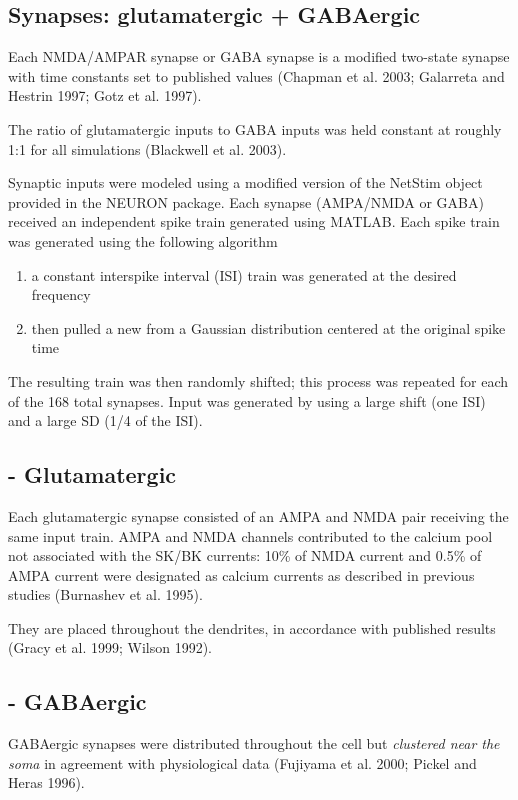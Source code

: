 \subsection{Synapses: glutamatergic + GABAergic}

Each NMDA/AMPAR synapse or GABA synapse is a modified two-state synapse with
time constants set to published values (Chapman et al. 2003; Galarreta and
Hestrin 1997; Gotz et al. 1997).

The ratio of glutamatergic inputs to GABA inputs was held constant at roughly
1:1 for all simulations (Blackwell et al. 2003).

Synaptic inputs were modeled using a modified version of the NetStim object
provided in the NEURON package.
Each synapse (AMPA/NMDA or GABA) received an independent spike train generated
using MATLAB. Each spike train was generated using the
following algorithm
\begin{enumerate}
  \item a constant interspike interval (ISI) train was
generated at the desired frequency
  \item then pulled a new from a Gaussian distribution centered at the original
  spike time
\end{enumerate}
The resulting train was then randomly shifted; this process was repeated
for each of the 168 total synapses. Input was generated by using a
large shift (one ISI) and a large SD (1/4 of the ISI).


\subsection{- Glutamatergic}

Each glutamatergic synapse consisted of an AMPA and NMDA pair receiving the same
input train. AMPA and NMDA channels contributed to the calcium pool
not associated with the SK/BK currents: 10\% of NMDA current and
0.5\% of AMPA current were designated as calcium currents as
described in previous studies (Burnashev et al. 1995).

They are placed throughout the dendrites, in accordance with published
results (Gracy et al. 1999; Wilson 1992).

\subsection{- GABAergic}

GABAergic synapses were distributed throughout the cell but {\it clustered near
the soma} in agreement with physiological data (Fujiyama et al. 2000; Pickel and
Heras 1996).

